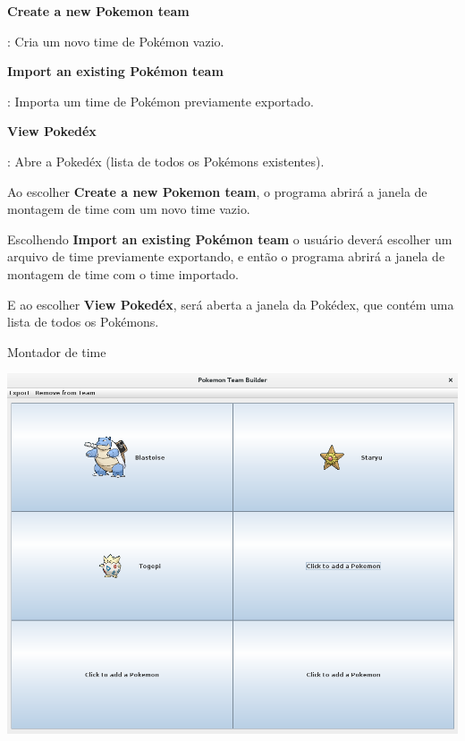 \documentclass[
	article,			%
	12pt,				%
	oneside,			%
	a4paper,			%
	english,			%
	brazil,				%
	sumario=tradicional
	]{abntex2}
\begin{document}
\begin{itemize}

{\item\bfseries Create a new Pokemon team}: Cria um novo time de Pokémon vazio.

{\item\bfseries Import an existing Pokémon team}: Importa um time de Pokémon previamente exportado.

{\item\bfseries View Pokedéx}: Abre a Pokedéx (lista de todos os Pokémons existentes).

\end{itemize}

Ao escolher {\bfseries Create a new Pokemon team}, o programa abrirá a janela de montagem de time com um novo time vazio.

Escolhendo {\bfseries Import an existing Pokémon team} o usuário deverá escolher um arquivo de time previamente exportando, e então o programa abrirá a janela de montagem de time com o time importado.

E ao escolher {\bfseries View Pokedéx}, será aberta a janela da Pokédex, que contém uma lista de todos os Pokémons.

\newpage
\begin{center}
{\Large Montador de time}
\end{center}



\begin{center}
\includegraphics[width=1\textwidth]{team_half}\par\vspace{1cm}
\end{center}



\end{document}
